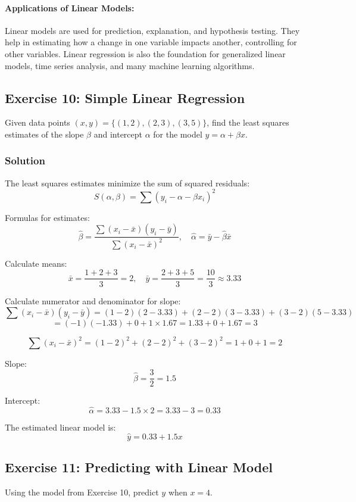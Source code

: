 \documentclass{book}
\begin{document}
\paragraph{Applications of Linear Models:}
Linear models are used for prediction, explanation, and hypothesis testing. They help in estimating how a change in one variable impacts another, controlling for other variables. Linear regression is also the foundation for generalized linear models, time series analysis, and many machine learning algorithms.

\subsection*{Exercise 10: Simple Linear Regression}
Given data points $(x, y) = \{(1, 2), (2, 3), (3, 5)\}$, find the least squares estimates of the slope $\beta$ and intercept $\alpha$ for the model $y = \alpha + \beta x$.

\subsubsection*{Solution}
The least squares estimates minimize the sum of squared residuals:
\[
S(\alpha, \beta) = \sum (y_i - \alpha - \beta x_i)^2
\]

Formulas for estimates:
\[
\hat{\beta} = \frac{\sum (x_i - \bar{x})(y_i - \bar{y})}{\sum (x_i - \bar{x})^2}, \quad \hat{\alpha} = \bar{y} - \hat{\beta} \bar{x}
\]

Calculate means:
\[
\bar{x} = \frac{1 + 2 + 3}{3} = 2, \quad \bar{y} = \frac{2 + 3 + 5}{3} = \frac{10}{3} \approx 3.33
\]

Calculate numerator and denominator for slope:
\[
\sum (x_i - \bar{x})(y_i - \bar{y}) = (1-2)(2-3.33) + (2-2)(3-3.33) + (3-2)(5-3.33)
\]
\[
= (-1)(-1.33) + 0 + 1 \times 1.67 = 1.33 + 0 + 1.67 = 3
\]

\[
\sum (x_i - \bar{x})^2 = (1-2)^2 + (2-2)^2 + (3-2)^2 = 1 + 0 + 1 = 2
\]

Slope:
\[
\hat{\beta} = \frac{3}{2} = 1.5
\]

Intercept:
\[
\hat{\alpha} = 3.33 - 1.5 \times 2 = 3.33 - 3 = 0.33
\]

The estimated linear model is:
\[
\hat{y} = 0.33 + 1.5 x
\]

\subsection*{Exercise 11: Predicting with Linear Model}
Using the model from Exercise 10, predict $y$ when $x=4$.
\end{document}
